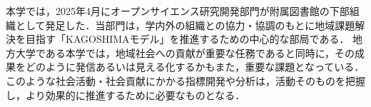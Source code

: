 本学では，2025年4月にオープンサイエンス研究開発部門が附属図書館の下部組織として発足した\cite{kgos1}．当部門は，学内外の組織との協力・協調のもとに地域課題解決を目指す「KAGOSHIMAモデル」\cite{kglib1}を推進するための中心的な部局である．
地方大学である本学では，地域社会への貢献が重要な任務であると同時に，その成果をどのように発信あるいは見える化するかもまた，重要な課題となっている．このような社会活動・社会貢献にかかる指標開発や分析は，活動そのものを把握し，より効果的に推進するために必要なものとなる．
